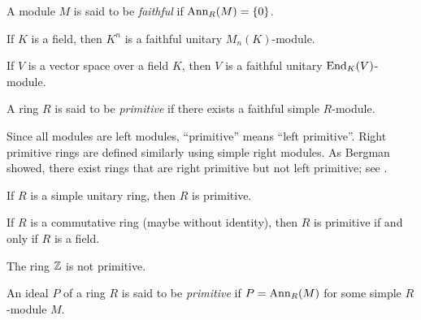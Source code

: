 \begin{definition}
A module $M$ is said to be \emph{faithful} if $\operatorname{Ann}_R(M)=\{0\}$. 
\end{definition}

\begin{example}
	If $K$ is a field, then $K^n$ is a faithful unitary $M_n(K)$-module.
\end{example}

\begin{example}
  If $V$ is a vector space over a field $K$, then $V$ is a faithful unitary
  $\operatorname{End}_K(V)$-module.
\end{example}

\begin{definition}
A ring $R$ is said to be \emph{primitive} if there exists a faithful simple $R$-module.  
\end{definition}

Since all modules are left modules, ``primitive'' means ``left primitive''. 
Right primitive rings are defined similarly using simple right
modules. As Bergman showed, there exist rings that are right primitive but not
left primitive; see \cite{MR175940,MR167497}. 

\begin{exercise}
	\label{xca:simple=>prim}
	If $R$ is a simple unitary ring, then $R$ is primitive. 
\end{exercise}

\begin{exercise}
	\label{xca:prim+conm=cuerpo}
	If $R$ is a commutative ring (maybe without identity), then $R$ is primitive if and only if $R$ is a field. 
\end{exercise}

\begin{example}
	The ring $\mathbb{Z}$ is not primitive. 
\end{example}

\begin{definition}
An ideal $P$ of a ring $R$ is said to be \emph{primitive} if $P=\operatorname{Ann}_R(M)$
for some simple $R$-module $M$. 
\end{definition}


